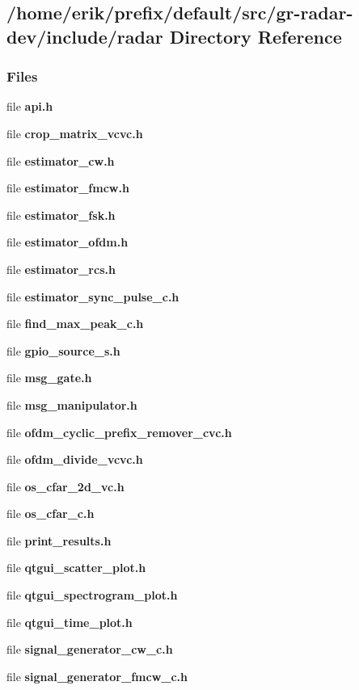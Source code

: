 \subsection{/home/erik/prefix/default/src/gr-\/radar-\/dev/include/radar Directory Reference}
\label{dir_4a0ae3e5e01b2ea63ef6e228e36f7520}
\subsubsection*{Files}
\begin{DoxyCompactItemize}
\item 
file {\bf api.\+h}
\item 
file {\bf crop\+\_\+matrix\+\_\+vcvc.\+h}
\item 
file {\bf estimator\+\_\+cw.\+h}
\item 
file {\bf estimator\+\_\+fmcw.\+h}
\item 
file {\bf estimator\+\_\+fsk.\+h}
\item 
file {\bf estimator\+\_\+ofdm.\+h}
\item 
file {\bf estimator\+\_\+rcs.\+h}
\item 
file {\bf estimator\+\_\+sync\+\_\+pulse\+\_\+c.\+h}
\item 
file {\bf find\+\_\+max\+\_\+peak\+\_\+c.\+h}
\item 
file {\bf gpio\+\_\+source\+\_\+s.\+h}
\item 
file {\bf msg\+\_\+gate.\+h}
\item 
file {\bf msg\+\_\+manipulator.\+h}
\item 
file {\bf ofdm\+\_\+cyclic\+\_\+prefix\+\_\+remover\+\_\+cvc.\+h}
\item 
file {\bf ofdm\+\_\+divide\+\_\+vcvc.\+h}
\item 
file {\bf os\+\_\+cfar\+\_\+2d\+\_\+vc.\+h}
\item 
file {\bf os\+\_\+cfar\+\_\+c.\+h}
\item 
file {\bf print\+\_\+results.\+h}
\item 
file {\bf qtgui\+\_\+scatter\+\_\+plot.\+h}
\item 
file {\bf qtgui\+\_\+spectrogram\+\_\+plot.\+h}
\item 
file {\bf qtgui\+\_\+time\+\_\+plot.\+h}
\item 
file {\bf signal\+\_\+generator\+\_\+cw\+\_\+c.\+h}
\item 
file {\bf signal\+\_\+generator\+\_\+fmcw\+\_\+c.\+h}

\end{DoxyCompactItemize}
